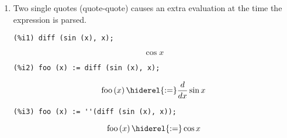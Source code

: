 \documentclass[12pt,leqno]{article}
\begin{document}
\begin{enumerate}
\item Two single quotes (quote-quote) causes an extra evaluation at the time the expression is parsed.
\begin{verbatim}
(%i1) diff (sin (x), x);
\end{verbatim}
\begin{dmath}[number={\(\mathop{\mathrm{\%o}_{1}}\)}]
\cos x
\end{dmath}
\begin{verbatim}
(%i2) foo (x) := diff (sin (x), x);
\end{verbatim}
\begin{dmath}[number={\(\mathop{\mathrm{\%o}_{2}}\)}]
\mathop{\mathrm{foo}}\left(x\right) \hiderel{:=} \frac{d}{\mathop{dx}}\sin x
\end{dmath}
\begin{verbatim}
(%i3) foo (x) := ''(diff (sin (x), x));
\end{verbatim}
\begin{dmath}[number={\(\mathop{\mathrm{\%o}_{3}}\)}]
\mathop{\mathrm{foo}}\left(x\right) \hiderel{:=} \cos x
\end{dmath}



\end{enumerate}
\end{document}
